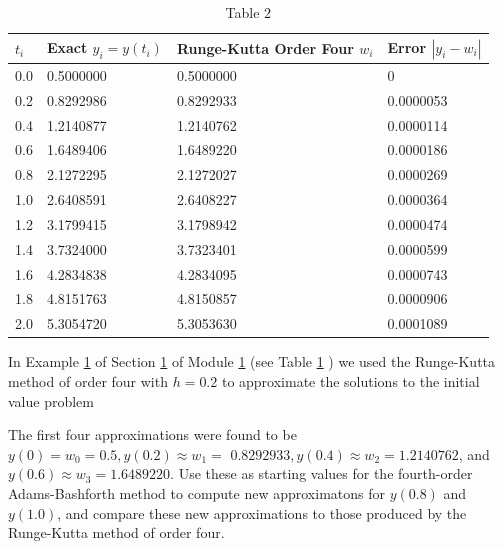 \begin{table}[h]
\centering
\begin{tabular}{|l|l|l|l|}
\hline
$t_{i}$ & Exact $y_{i}=y\left(t_{i}\right)$ & Runge-Kutta Order Four $w_{i}$ & Error $\left|y_{i}-w_{i}\right|$ \\
\hline
0.0 & 0.5000000 & 0.5000000 & 0 \\
\hline
0.2 & 0.8292986 & 0.8292933 & 0.0000053 \\
\hline
0.4 & 1.2140877 & 1.2140762 & 0.0000114 \\
\hline
0.6 & 1.6489406 & 1.6489220 & 0.0000186 \\
\hline
0.8 & 2.1272295 & 2.1272027 & 0.0000269 \\
\hline
1.0 & 2.6408591 & 2.6408227 & 0.0000364 \\
\hline
1.2 & 3.1799415 & 3.1798942 & 0.0000474 \\
\hline
1.4 & 3.7324000 & 3.7323401 & 0.0000599 \\
\hline
1.6 & 4.2834838 & 4.2834095 & 0.0000743 \\
\hline
1.8 & 4.8151763 & 4.8150857 & 0.0000906 \\
\hline
2.0 & 5.3054720 & 5.3053630 & 0.0001089 \\
\hline
\end{tabular}
\caption{\scriptsize Table $2$}
\label{}
\end{table}


%
%
\begin{example}
In Example \ref{} of Section \ref{} of Module \ref{} (see Table \ref{} ) we used the Runge-Kutta method of order four with $h=0.2$ to approximate the solutions to the initial value problem

The first four approximations were found to be $y(0)=w_{0}=0.5, y(0.2) \approx w_{1}=$ $0.8292933, y(0.4) \approx w_{2}=1.2140762$, and $y(0.6) \approx w_{3}=1.6489220$. Use these as starting values for the fourth-order Adams-Bashforth method to compute new approximatons for $y(0.8)$ and $y(1.0)$, and compare these new approximations to those produced by the Runge-Kutta method of order four.
\end{example}

